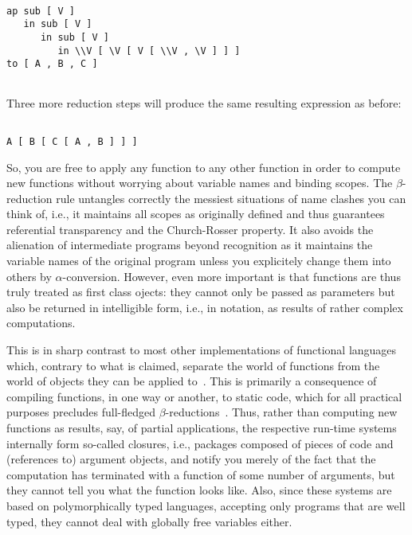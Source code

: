 \begin{verbatim}

ap sub [ V ]
   in sub [ V ]
      in sub [ V ]
         in \\V [ \V [ V [ \\V , \V ] ] ]
to [ A , B , C ]


\end{verbatim}
Three more reduction steps will produce the same resulting expression as
before:
\begin{verbatim}

A [ B [ C [ A , B ] ] ]

\end{verbatim}
So, you are free to apply any function to any other function in order to
compute new functions without worrying about variable names and binding
 scopes. The $\beta$-reduction rule untangles correctly the messiest
situations of name clashes you can think of, i.e., it maintains all 
scopes as originally defined and thus guarantees {\mys 
referential transparency} and the {\mys Church-Rosser property}.
It also avoids the alienation of intermediate programs beyond recognition as
it maintains the variable names of the original
program unless you explicitely change them into others by $\alpha$-conversion.
However, even more important is that functions are thus truly treated as
first class ojects: they cannot only be passed as parameters but also be 
returned in intelligible form, i.e., in \kir notation, as results of
rather complex computations. 

This is in sharp contrast to most other implementations of functional
languages which, contrary to what is claimed, separate the world of
functions from the world of objects they can be applied to~\cite{burs80,harp86,turn85a,huda88}. This is
primarily a consequence of compiling functions, in one way or another, to
 static code, which for all practical purposes precludes full-fledged
$\beta$-reductions~\cite{augu84,john87,appe87}. Thus, rather than computing new functions as results, say, of
partial applications, the respective run-time systems internally form so-called
{\mys closures}, i.e., packages composed of pieces of code and (references to)
argument objects,
and notify  you merely of the fact that the computation has terminated
with a function of some number of arguments, but they cannot tell you
what the function looks like. Also, since these systems are based on
 {\mys polymorphically typed languages}, accepting only programs that
are well typed, they cannot deal with globally free variables either. 
 


